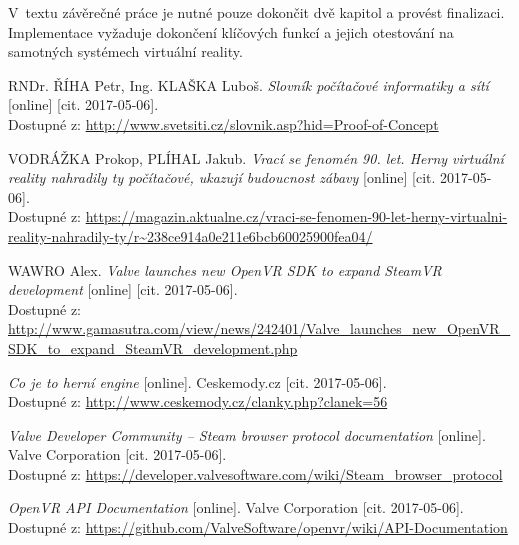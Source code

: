\documentclass[12pt, a4paper]{article}
\begin{document}
V~textu závěrečné práce je nutné pouze dokončit dvě kapitol a provést finalizaci. Implementace vyžaduje dokončení klíčových funkcí a jejich otestování na samotných systémech virtuální reality.

\newpage

\renewcommand\refname{Zdroje}

\begingroup
\raggedright
\begin{thebibliography}{}
    		RNDr. ŘÍHA Petr, Ing. KLAŠKA Luboš. \emph{Slovník počítačové informatiky a sítí} [online] [cit. 2017-05-06].\\ Dostupné z: \url{http://www.svetsiti.cz/slovnik.asp?hid=Proof-of-Concept}

    		VODRÁŽKA Prokop, PLÍHAL Jakub. \emph{Vrací se fenomén 90. let. Herny virtuální reality nahradily ty počítačové, ukazují budoucnost zábavy} [online] [cit. 2017-05-06].\\ Dostupné z: \url{https://magazin.aktualne.cz/vraci-se-fenomen-90-let-herny-virtualni-reality-nahradily-ty/r~238ce914a0e211e6bcb60025900fea04/}

    		WAWRO Alex. \emph{Valve launches new OpenVR SDK to expand SteamVR development} [online] [cit. 2017-05-06].\\ Dostupné z: \url{http://www.gamasutra.com/view/news/242401/Valve_launches_new_OpenVR_SDK_to_expand_SteamVR_development.php}

    		\emph{Co je to herní engine} [online]. Ceskemody.cz [cit. 2017-05-06].\\ Dostupné z: \url{http://www.ceskemody.cz/clanky.php?clanek=56}

    		\emph{Valve Developer Community -- Steam browser protocol documentation} [online]. Valve Corporation [cit. 2017-05-06].\\ Dostupné z: \url{https://developer.valvesoftware.com/wiki/Steam_browser_protocol}

    		\emph{OpenVR API Documentation} [online]. Valve Corporation [cit. 2017-05-06].\\ Dostupné z: \url{https://github.com/ValveSoftware/openvr/wiki/API-Documentation}
\end{thebibliography}
\endgroup
\end{document}
